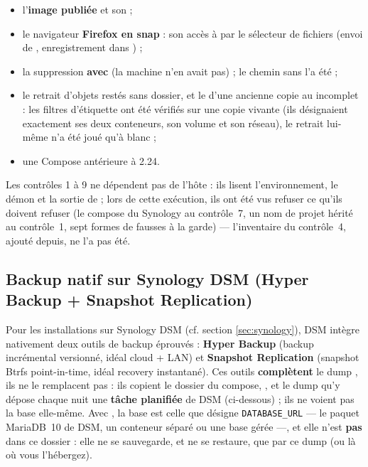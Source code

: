 \documentclass[a4paper,11pt,oneside]{article}
\begin{document}
\begin{keshnote}[title=Ce que cette procédure n'a pas éprouvé]
\begin{itemize}
    \item l'\textbf{image publiée}  et son  ;
    \item le navigateur \textbf{Firefox en snap} : son accès à  par le sélecteur de fichiers (envoi de , enregistrement dans ) ;
    \item la suppression \textbf{avec } (la machine n'en avait pas) ; le chemin sans  l'a été ;
    \item le retrait d'objets restés sans dossier, et le  d'une ancienne copie au  incomplet : les filtres d'étiquette ont été vérifiés sur une copie vivante (ils désignaient exactement ses deux conteneurs, son volume et son réseau), le retrait lui-même n'a été joué qu'à blanc ;
    \item une Compose antérieure à 2.24.
\end{itemize}
Les contrôles 1 à 9 ne dépendent pas de l'hôte : ils lisent l'environnement, le démon et la sortie de  ; lors de cette exécution, ils ont été vus refuser ce qu'ils doivent refuser (le compose du Synology au contrôle~7, un nom de projet hérité au contrôle~1, sept formes de  fausses à la garde) --- l'inventaire du contrôle~4, ajouté depuis, ne l'a pas été.
\end{keshnote}
\endgroup

\subsection{Backup natif sur Synology DSM (Hyper Backup + Snapshot Replication)}\label{sec:backup-dsm}
\sloppy

Pour les installations sur Synology DSM (cf. section \ref{sec:synology}), DSM intègre nativement deux outils de backup éprouvés : \textbf{Hyper Backup} (backup incrémental versionné, idéal cloud + LAN) et \textbf{Snapshot Replication} (snapshot Btrfs point-in-time, idéal recovery instantané). Ces outils \textbf{complètent} le dump , ils ne le remplacent pas : ils copient le dossier du compose, , et le dump qu'y dépose chaque nuit une \textbf{tâche planifiée} de DSM (ci-dessous) ; ils ne voient pas la base elle-même. Avec , la base est celle que désigne \texttt{DATABASE\_URL} --- le paquet MariaDB~10 de DSM, un conteneur séparé ou une base gérée ---, et elle n'est \textbf{pas} dans ce dossier : elle ne se sauvegarde, et ne se restaure, que par ce dump (ou là où vous l'hébergez).
\end{document}

